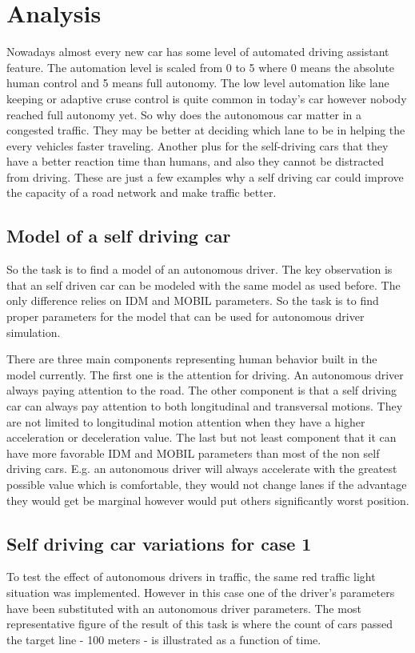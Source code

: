 \chapter{Analysis}
	Nowadays almost every new car has some level of automated driving assistant feature. The automation level is scaled from 0 to 5 where 0 means the absolute human control and 5 means full autonomy. The low level automation like lane keeping or adaptive cruse control is quite common in today's car however nobody reached full autonomy yet. So why does the autonomous car matter in a congested traffic. They may be better at deciding which lane to be in helping the every vehicles faster traveling. Another plus for the self-driving cars that they have a better reaction time than humans, and also they cannot be distracted from driving. These are just a few examples why a self driving car could improve the capacity of a road network and make traffic better.
	\section{Model of a self driving car}
		So the task is to find a model of an autonomous driver. The key observation is that an self driven car can be modeled with the same model as used before. The only difference relies on IDM and MOBIL parameters. So the task is to find proper parameters for the model that can be used for autonomous driver simulation.
	
		There are three main components representing human behavior built in the model currently. The first one is the attention for driving. An autonomous driver always paying attention to the road. The other component is that a self driving car can always pay attention to both longitudinal and transversal motions. They are not limited to longitudinal motion attention when they have a higher acceleration or deceleration value. The last but not least component that it can have more favorable IDM and MOBIL parameters than most of the non self driving cars. E.g. an autonomous driver will always accelerate with the greatest possible value which is comfortable, they would not change lanes if the advantage they would get be marginal however would put others significantly worst position.
	\section{Self driving car variations for case 1}
		To test the effect of autonomous drivers in traffic, the same red traffic light situation was implemented. However in this case one of the driver's parameters have been substituted with an autonomous driver parameters. The most representative figure of the result of this task is where the count of cars passed the target line - 100 meters - is illustrated as a function of time. 
